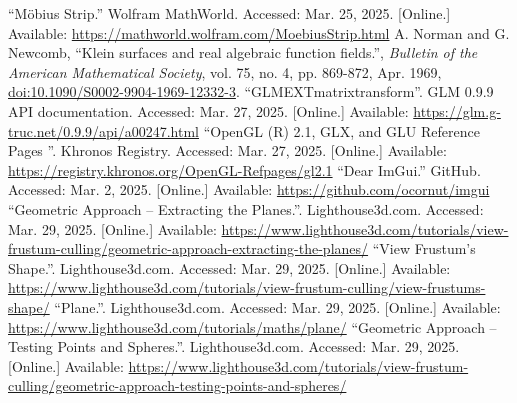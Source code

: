 \documentclass[12pt, a4paper]{article}
\begin{document}
\begin{thebibliography}{9}
        ``Möbius Strip.'' Wolfram MathWorld. Accessed: Mar. 25, 2025. [Online.] Available:
        \url{https://mathworld.wolfram.com/MoebiusStrip.html}
        A. Norman and G. Newcomb, ``Klein surfaces and real algebraic function fields.'',
        \emph{Bulletin of the American Mathematical Society}, vol. 75, no. 4, pp. 869-872,
        Apr. 1969, \url{doi:10.1090/S0002-9904-1969-12332-3}.
        ``GLM\textunderscore EXT\textunderscore matrix\textunderscore transform''. GLM 0.9.9 API
        documentation. Accessed: Mar. 27, 2025. [Online.] Available:
        \url{https://glm.g-truc.net/0.9.9/api/a00247.html}
        ``OpenGL (R) 2.1, GLX, and GLU Reference Pages ''. Khronos Registry.
        Accessed: Mar. 27, 2025. [Online.] Available:
        \url{https://registry.khronos.org/OpenGL-Refpages/gl2.1}
        ``Dear ImGui.'' GitHub. Accessed: Mar. 2, 2025. [Online.] Available:
        \url{https://github.com/ocornut/imgui}
        ``Geometric Approach -- Extracting the Planes.''. Lighthouse3d.com. Accessed:
        Mar. 29, 2025. [Online.] Available:
        \url{https://www.lighthouse3d.com/tutorials/view-frustum-culling/geometric-approach-extracting-the-planes/}
        ``View Frustum’s Shape.''. Lighthouse3d.com. Accessed:
        Mar. 29, 2025. [Online.] Available:
        \url{https://www.lighthouse3d.com/tutorials/view-frustum-culling/view-frustums-shape/}
        ``Plane.''. Lighthouse3d.com. Accessed:
        Mar. 29, 2025. [Online.] Available:
        \url{https://www.lighthouse3d.com/tutorials/maths/plane/}
        ``Geometric Approach -- Testing Points and Spheres.''. Lighthouse3d.com. Accessed:
        Mar. 29, 2025. [Online.] Available:
        \url{https://www.lighthouse3d.com/tutorials/view-frustum-culling/geometric-approach-testing-points-and-spheres/}
\end{thebibliography}
\endgroup
\end{document}
